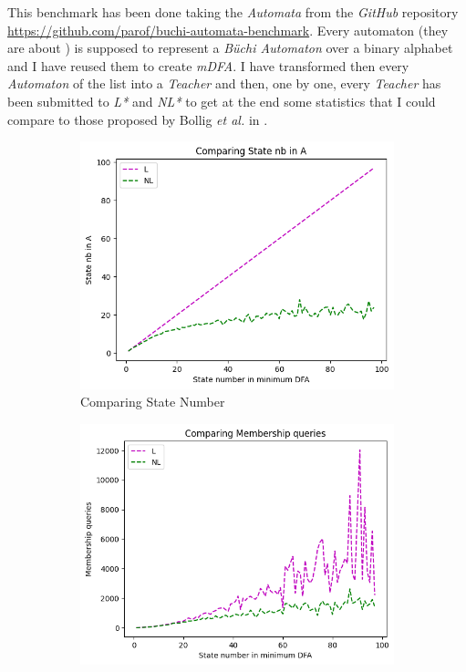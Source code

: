 This benchmark has been done taking the \textit{Automata} from the \textit{GitHub} repository \url{https://github.com/parof/buchi-automata-benchmark}. Every automaton (they are about ) is supposed to represent a \textit{Büchi Automaton} over a binary alphabet and I have reused them to create \textit{mDFA}. I have transformed then every \textit{Automaton} of the list into a \textit{Teacher} and then, one by one, every \textit{Teacher} has been submitted to \textit{L*} and \textit{NL*} to get at the end some statistics that I could compare to those proposed by Bollig \textit{et al.} in \cite{NLPaper}.

\begin{figure}[!htb]
  \centering
  \begin{subfigure}[b]{0.3\textwidth}
    \includegraphics[width=\textwidth]{../statistics/plots/BenchMark/State nb in A.png}
    \caption{Comparing State Number}
    \label{fig:StateBenchMarkCompare}
  \end{subfigure}
  \begin{subfigure}[b]{0.3\textwidth}
    \includegraphics[width=\textwidth]{../statistics/plots/BenchMark/Membership queries.png}

\end{subfigure}
\end{figure}
